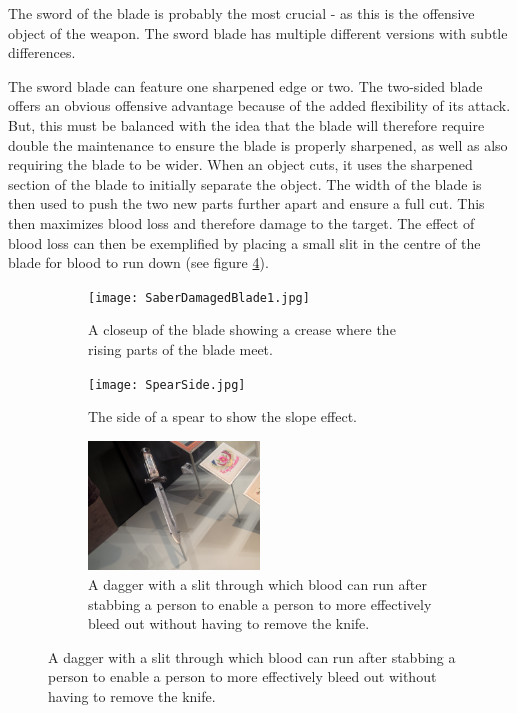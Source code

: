 \documentclass{article}
\begin{document}
The sword of the blade is probably the most crucial - as this is the offensive object of the weapon. The sword blade has multiple different versions with subtle differences.

The sword blade can feature one sharpened edge or two. The two-sided blade offers an obvious offensive advantage because of the added flexibility of its attack. But, this must be balanced with the idea that the blade will therefore require double the maintenance to ensure the blade is properly sharpened, as well as also requiring the blade to be wider. When an object cuts, it uses the sharpened section of the blade to initially separate the object. The width of the blade is then used to push the two new parts further apart and ensure a full cut. This then maximizes blood loss and therefore damage to the target. The effect of blood loss can then be exemplified by placing a small slit in the centre of the blade for blood to run down (see figure \ref{fig:swordSlit}). 

\begin{figure}[h]
    \centering
    \caption{}
    \begin{subfigure}{0.49\textwidth}
        \texttt{[image: SaberDamagedBlade1.jpg]}
        \caption{A closeup of the blade showing a crease where the rising parts of the blade meet.}
        \label{fig:SwordCrease}
    \end{subfigure}
    \begin{subfigure}{0.49\textwidth}
        \texttt{[image: SpearSide.jpg]}
        \caption{The side of a spear to show the slope effect.}
        \label{fig:SpearSide}
    \end{subfigure}
    \begin{subfigure}{\textwidth}
        \centering
        \includegraphics[width=0.5\textwidth]{Dagger2.jpg}
        \caption{A dagger with a slit through which blood can run after stabbing a person to enable a person to more effectively bleed out without having to remove the knife.}
        \label{fig:swordSlit}
    \end{subfigure}
\end{figure}
\end{document}
